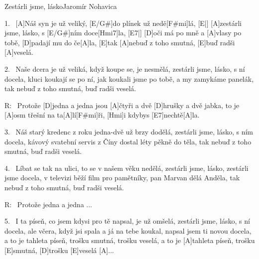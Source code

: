 \begin{song}{Zestárli jsme, lásko}{Jaromír Nohavica}

\begin{xverse}{1.~}
[A]Náš syn je už veliký, [E/G#]do plínek už nedě[F#mi]lá, [E|]{}
[A]zestárli jsme, lásko, s [E/G#]ním doce[Hmi7]la,  [E7|]{}
[D]oči má po mně a [A]vlasy po tobě,
[D]padají mu do če[A]la,
[E]tak [A]nebuď z toho smutná, [E]buď radši [A]veselá.
\end{xverse}

\begin{xverse}{2.~}
Naše dcera je už veliká, když koupe se, je nesmělá,
zestárli jsme, lásko, s ní docela,
kluci koukají se po ní, jak koukali jsme po tobě,
a my zamykáme panelák,
tak nebuď z toho smutná, buď radši veselá.
\end{xverse}

\begin{xverse}{R:~}
Protože [D]jedna a jedna jsou [A]{čt}yři
a dvě [D]hrušky a dvě jabka, to je [A]osm třešní na ta[A]lí[F#mi]{ři},
[Hmi]i kdybys [E7]nechtě[A]la.
\end{xverse}

\begin{xverse}{3.~}
Náš starý kredenc z roku jedna-dvě už brzy dodělá,
zestárli jsme, lásko, s ním docela,
kávový svatební servis z Číny
dostal léty pěkně do těla,
tak nebuď z toho smutná, buď radši veselá.
\end{xverse}

\begin{xverse}{4.~}
Líbat se tak na ulici, to se v našem věku nedělá,
zestárli jsme, lásko, zestárli jsme docela,
v televizi běží film pro pamětníky,
pan Marvan dělá Anděla,
tak nebuď z toho smutná, buď radši veselá.
\end{xverse}

\begin{xverse}{R:~}
Protože jedna a jedna ...
\end{xverse}

\begin{xverse}{5.~}
I ta píseň, co jsem kdysi pro tě napsal, je už omšelá,
zestárli jsme, lásko, s ní docela,
ale včera, když jsi spala a já na tebe koukal,
napsal jsem ti novou docela,
a to je tahleta píseň, trošku smutná, trošku veselá,
a to je [A]tahleta píseň, trošku [E]smutná, [D]trošku [E]veselá [A]...
\end{xverse}

\end{song}




